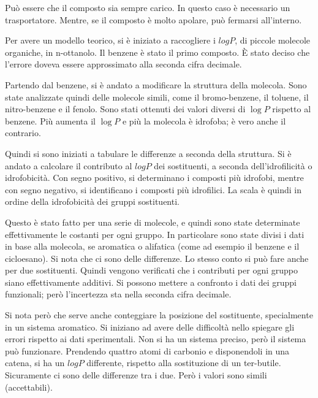 Può essere che il composto sia sempre carico. In questo caso è
necessario un trasportatore. Mentre, se il composto è molto apolare, può
fermarsi all'interno.

Per avere un modello teorico, si è iniziato a raccogliere i \(log P\), di piccole molecole organiche,
in n-ottanolo. Il benzene è stato il primo composto.
È stato deciso che l'errore doveva essere approssimato alla seconda
cifra decimale.

Partendo dal benzene, si è andato a modificare la struttura della
molecola. Sono state analizzate quindi delle molecole simili, come il
bromo-benzene, il toluene, il nitro-benzene e il fenolo. Sono stati
ottenuti dei valori diversi di \(\log P\) rispetto al benzene.
Più aumenta il \(\log P\) e più la molecola è idrofoba; è vero anche il
contrario.

Quindi si sono iniziati a tabulare le differenze a seconda della
struttura. Si è andato a calcolare il contributo al \(log P\) dei
sostituenti, a seconda dell'idrofilicità o idrofobicità.
Con segno positivo, si determinano i composti più idrofobi, mentre con
segno negativo, si identificano i composti più idrofilici. La scala è
quindi in ordine della idrofobicità dei gruppi sostituenti.

Questo è stato fatto per una serie di molecole, e quindi sono state
determinate effettivamente le costanti per ogni gruppo. In particolare
sono state divisi i dati in base alla molecola, se aromatica o alifatica
(come ad esempio il benzene e il cicloesano). Si nota che ci sono delle
differenze.
Lo stesso conto si può fare anche per due sostituenti. Quindi vengono
verificati che i contributi per ogni gruppo siano effettivamente
additivi.
Si possono mettere a confronto i dati dei gruppi funzionali; però
l'incertezza sta nella seconda cifra decimale.

Si nota però che serve anche conteggiare la posizione del sostituente,
specialmente in un sistema aromatico. Si iniziano ad avere delle
difficoltà nello spiegare gli errori rispetto ai dati sperimentali.
Non si ha un sistema preciso, però il sistema può funzionare.
Prendendo quattro atomi di carbonio e disponendoli in una catena, si ha
un \(log P\) differente, rispetto alla sostituzione di un ter-butile.
Sicuramente ci sono delle differenze tra i due. Però i valori sono
simili (accettabili).

